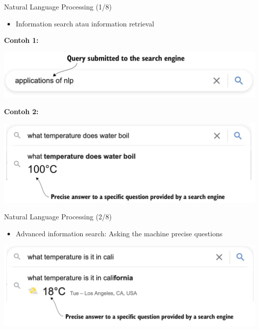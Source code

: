 \documentclass[pdf]{beamer}
\theoremstyle{mystyle}
\begin{document}
\begin{frame}{Natural Language Processing (1/8)}
	\begin{itemize}		
		\item Information search atau information retrieval \citep{kochmar2022getting}
	\end{itemize}
	\textbf{Contoh 1:}
	\begin{center}
		\includegraphics[scale=.25]{images/search-engine-1}
	\end{center}
	\textbf{Contoh 2:}
	\begin{center}
		\includegraphics[scale=.2]{images/search-engine-2}
	\end{center}
\end{frame}

\begin{frame}{Natural Language Processing (2/8)}
	\begin{itemize}		
		\item Advanced information search: Asking the machine precise questions
	\end{itemize}
	\begin{center}
		\includegraphics[scale=.225]{images/search-engine-3}
	\end{center}
\end{frame}
\end{document}
